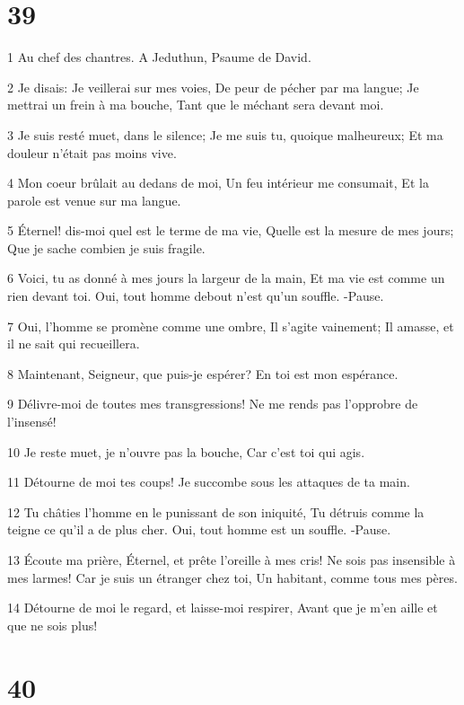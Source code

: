 \chapter{39}

\par 1 Au chef des chantres. A Jeduthun, Psaume de David.
\par 2 Je disais: Je veillerai sur mes voies, De peur de pécher par ma langue; Je mettrai un frein à ma bouche, Tant que le méchant sera devant moi.
\par 3 Je suis resté muet, dans le silence; Je me suis tu, quoique malheureux; Et ma douleur n'était pas moins vive.
\par 4 Mon coeur brûlait au dedans de moi, Un feu intérieur me consumait, Et la parole est venue sur ma langue.
\par 5 Éternel! dis-moi quel est le terme de ma vie, Quelle est la mesure de mes jours; Que je sache combien je suis fragile.
\par 6 Voici, tu as donné à mes jours la largeur de la main, Et ma vie est comme un rien devant toi. Oui, tout homme debout n'est qu'un souffle. -Pause.
\par 7 Oui, l'homme se promène comme une ombre, Il s'agite vainement; Il amasse, et il ne sait qui recueillera.
\par 8 Maintenant, Seigneur, que puis-je espérer? En toi est mon espérance.
\par 9 Délivre-moi de toutes mes transgressions! Ne me rends pas l'opprobre de l'insensé!
\par 10 Je reste muet, je n'ouvre pas la bouche, Car c'est toi qui agis.
\par 11 Détourne de moi tes coups! Je succombe sous les attaques de ta main.
\par 12 Tu châties l'homme en le punissant de son iniquité, Tu détruis comme la teigne ce qu'il a de plus cher. Oui, tout homme est un souffle. -Pause.
\par 13 Écoute ma prière, Éternel, et prête l'oreille à mes cris! Ne sois pas insensible à mes larmes! Car je suis un étranger chez toi, Un habitant, comme tous mes pères.
\par 14 Détourne de moi le regard, et laisse-moi respirer, Avant que je m'en aille et que ne sois plus!

\chapter{40}

